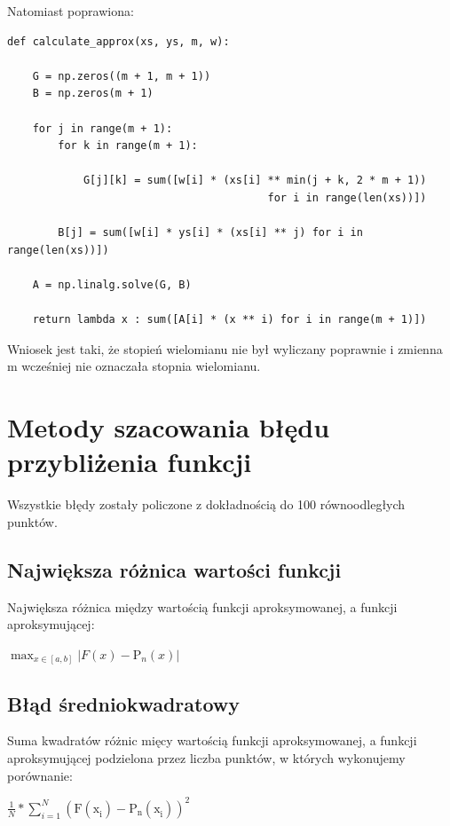 \documentclass{article}
\begin{document}
\noindent
Natomiast poprawiona:

\begin{verbatim}
def calculate_approx(xs, ys, m, w):
    
    G = np.zeros((m + 1, m + 1))
    B = np.zeros(m + 1)
    
    for j in range(m + 1):
        for k in range(m + 1):
            
            G[j][k] = sum([w[i] * (xs[i] ** min(j + k, 2 * m + 1)) 
                                         for i in range(len(xs))])
        
        B[j] = sum([w[i] * ys[i] * (xs[i] ** j) for i in range(len(xs))])
   
    A = np.linalg.solve(G, B)
    
    return lambda x : sum([A[i] * (x ** i) for i in range(m + 1)])
\end{verbatim}

\noindent
Wniosek jest taki, że stopień wielomianu nie był wyliczany poprawnie i zmienna m wcześniej nie oznaczała stopnia wielomianu.

\section{Metody szacowania błędu przybliżenia funkcji}

Wszystkie błędy zostały policzone z dokładnością do 100 równoodległych punktów.

\subsection{Największa różnica wartości funkcji}

Największa różnica między wartością funkcji aproksymowanej, a funkcji aproksymującej:

\begin{center}
    \(\max_{x\in [a, b]} |F(x) - \mathrm{P}_{n}^{}(x)|\)
\end{center}

\subsection{Błąd średniokwadratowy}

Suma kwadratów różnic mięcy wartością funkcji aproksymowanej, a funkcji aproksymującej podzielona przez liczba punktów, w których wykonujemy porównanie:

\begin{center}
\(\frac{1}{N} * \sum_{i = 1}^{N}\mathrm{(F(\mathrm{x}_{i}^{}) - \mathrm{P}_{n}^{}(\mathrm{x}_{i}^{}))}_{}^{2}\)
\end{center}
\end{document}
